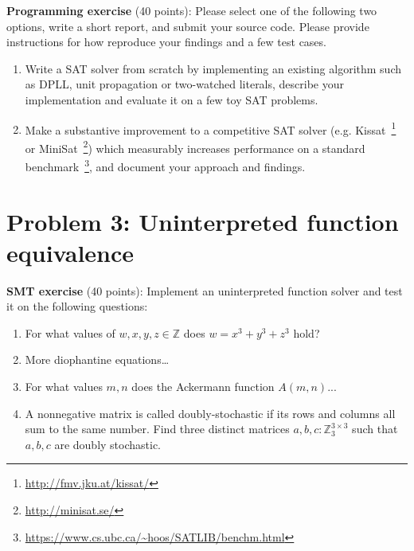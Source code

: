 \documentclass[11pt]{article}
\begin{document}
    \noindent \textbf{Programming exercise} (40 points): Please select one of the following two options, write a short report, and submit your source code. Please provide instructions for how reproduce your findings and a few test cases.

    \begin{enumerate}
    \item Write a SAT solver from scratch by implementing an existing algorithm such as DPLL, unit propagation or two-watched literals, describe your implementation and evaluate it on a few toy SAT problems.
    \item Make a substantive improvement to a competitive SAT solver (e.g. Kissat~\footnote{\url{http://fmv.jku.at/kissat/}} or MiniSat~\footnote{\url{http://minisat.se/}}) which measurably increases performance on a standard benchmark~\footnote{\url{https://www.cs.ubc.ca/~hoos/SATLIB/benchm.html}}, and document your approach and findings.
    \end{enumerate}

    \section {Problem 3: Uninterpreted function equivalence}

    \noindent \textbf{SMT exercise} (40 points): Implement an uninterpreted function solver and test it on the following questions:\\

    \begin{enumerate}
    \item For what values of $w, x, y, z \in \mathbb{Z}$ does $w = x^3+y^3+z^3$ hold?
    \item More diophantine equations\ldots
    \item For what values $m, n$ does the Ackermann function $A(m, n)$...
    \item A nonnegative matrix is called doubly-stochastic if its rows and columns all sum to the same number. Find three distinct matrices $a, b, c: \mathbb{Z}_3^{3\times 3}$ such that $a, b, c$ are doubly stochastic.
    \end{enumerate}
\end{document}
